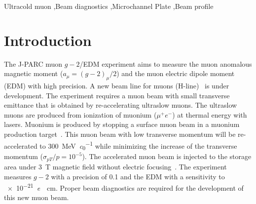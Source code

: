\documentclass[preprint,3p,twocolumn]{elsarticle}
\begin{document}
\begin{frontmatter}
\begin{abstract}
  A beam profile monitor (BPM) based on a microchannel plate has
  been developed for ultracold muon beams for the measurement of
  the muon anomalous magnetic moment and electric dipole moment at
  high precision, with capability of diagnosing muon beams of
  energy range from a few \si{keV} to \SI{4}{MeV}.  The
  performance of the BPM has been evaluated using a surface muon
  beam at J-PARC and additionally with a UV light source.  It has
  been confirmed that the BPM has a dynamic range from a few to
  $10^4$ muons per bunch without saturation.  The resolution of
  the BPM has been estimated to be less than \SI{0.30}{\mm}.  A
  partial discrimination of positrons from muons has
  been achieved under discrete particle conditions.

\end{abstract}

\begin{keyword}
Ultracold muon \sep Beam diagnostics \sep Microchannel Plate \sep Beam profile
\end{keyword}

\end{frontmatter}

\linenumbers

%
%
%
%


\section{Introduction}

The J-PARC muon $g-2$/EDM experiment \cite{E34} aims to measure
the muon anomalous magnetic moment ($a_{\mu} = (g-2)_{\mu}/2$) and the muon electric
dipole moment (EDM) with high precision.  A new beam line for
muons (H-line)~\cite{h-line} is under development.  The
experiment requires a muon beam with small transverse emittance
that is obtained by re-accelerating ultraslow muons.  The
ultraslow muons are produced from ionization of muonium
($\mu^{+}e^{-}$) at thermal
energy with lasers.  Muonium is produced by stopping a surface muon
beam in a muonium production target~\cite{muonium}.  This muon
beam with low transverse momentum will be re-accelerated to
\SI{300}{\MeV\per\clight} \cite{IH} while minimizing the increase
of the transverse momentum ($\sigma_{pT}/p = 10^{-5}$).  The
accelerated muon beam is injected to the storage area under
\SI{3}{\tesla} magnetic field without electric
focusing~\cite{injection}.  The experiment measures $g-2$ with a
precision of \SI{0.1}{\ppm} and the EDM with a sensitivity to
\SI{e-21}{\elementarycharge \cdot \cm}.  Proper beam diagnostics
are required for the development of this new muon beam.
\end{document}
